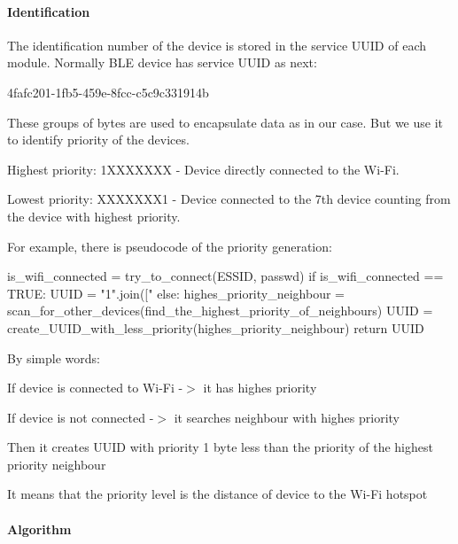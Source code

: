 \paragraph*{Identification}

The identification number of the device is stored in the service U\+U\+ID of each module. Normally B\+LE device has service U\+U\+ID as next\+: 
\begin{DoxyCode}
4fafc201-1fb5-459e-8fcc-c5c9c331914b
\end{DoxyCode}
 These groups of bytes are used to encapsulate data as in our case. But we use it to identify priority of the devices.
\begin{DoxyEnumerate}
\item Highest priority\+: 1\+X\+X\+X\+X\+X\+XX -\/ Device directly connected to the Wi-\/\+Fi.
\item Lowest priority\+: X\+X\+X\+X\+X\+X\+X1 -\/ Device connected to the 7th device counting from the device with highest priority.
\end{DoxyEnumerate}

For example, there is pseudocode of the priority generation\+: 
\begin{DoxyCode}
is\_wifi\_connected = try\_to\_connect(ESSID, passwd)
if is\_wifi\_connected == TRUE:
  UUID = "1".join(["%
else:
  highes\_priority\_neighbour = scan\_for\_other\_devices(find\_the\_highest\_priority\_of\_neighbours)
  UUID = create\_UUID\_with\_less\_priority(highes\_priority\_neighbour)
return UUID
\end{DoxyCode}


By simple words\+:
\begin{DoxyEnumerate}
\item If device is connected to Wi-\/\+Fi -\/$>$ it has highes priority
\item If device is not connected -\/$>$ it searches neighbour with highes priority
\item Then it creates U\+U\+ID with priority 1 byte less than the priority of the highest priority neighbour
\item It means that the priority level is the distance of device to the Wi-\/\+Fi hotspot
\end{DoxyEnumerate}

\paragraph*{Algorithm}

